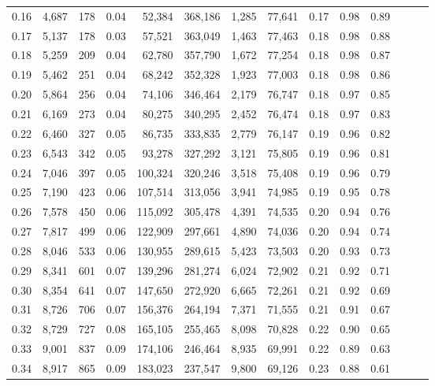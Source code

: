 \begin{tabular}{rrrrrrrrrrrrrr}
0.16 &  4,687 &    178 &  0.04 &   52,384 &  368,186 &   1,285 &  77,641 &  0.17 &  0.98 &      0.89 \\
0.17 &  5,137 &    178 &  0.03 &   57,521 &  363,049 &   1,463 &  77,463 &  0.18 &  0.98 &      0.88 \\
0.18 &  5,259 &    209 &  0.04 &   62,780 &  357,790 &   1,672 &  77,254 &  0.18 &  0.98 &      0.87 \\
0.19 &  5,462 &    251 &  0.04 &   68,242 &  352,328 &   1,923 &  77,003 &  0.18 &  0.98 &      0.86 \\
0.20 &  5,864 &    256 &  0.04 &   74,106 &  346,464 &   2,179 &  76,747 &  0.18 &  0.97 &      0.85 \\
0.21 &  6,169 &    273 &  0.04 &   80,275 &  340,295 &   2,452 &  76,474 &  0.18 &  0.97 &      0.83 \\
0.22 &  6,460 &    327 &  0.05 &   86,735 &  333,835 &   2,779 &  76,147 &  0.19 &  0.96 &      0.82 \\
0.23 &  6,543 &    342 &  0.05 &   93,278 &  327,292 &   3,121 &  75,805 &  0.19 &  0.96 &      0.81 \\
0.24 &  7,046 &    397 &  0.05 &  100,324 &  320,246 &   3,518 &  75,408 &  0.19 &  0.96 &      0.79 \\
0.25 &  7,190 &    423 &  0.06 &  107,514 &  313,056 &   3,941 &  74,985 &  0.19 &  0.95 &      0.78 \\
0.26 &  7,578 &    450 &  0.06 &  115,092 &  305,478 &   4,391 &  74,535 &  0.20 &  0.94 &      0.76 \\
0.27 &  7,817 &    499 &  0.06 &  122,909 &  297,661 &   4,890 &  74,036 &  0.20 &  0.94 &      0.74 \\
0.28 &  8,046 &    533 &  0.06 &  130,955 &  289,615 &   5,423 &  73,503 &  0.20 &  0.93 &      0.73 \\
0.29 &  8,341 &    601 &  0.07 &  139,296 &  281,274 &   6,024 &  72,902 &  0.21 &  0.92 &      0.71 \\
0.30 &  8,354 &    641 &  0.07 &  147,650 &  272,920 &   6,665 &  72,261 &  0.21 &  0.92 &      0.69 \\
0.31 &  8,726 &    706 &  0.07 &  156,376 &  264,194 &   7,371 &  71,555 &  0.21 &  0.91 &      0.67 \\
0.32 &  8,729 &    727 &  0.08 &  165,105 &  255,465 &   8,098 &  70,828 &  0.22 &  0.90 &      0.65 \\
0.33 &  9,001 &    837 &  0.09 &  174,106 &  246,464 &   8,935 &  69,991 &  0.22 &  0.89 &      0.63 \\
0.34 &  8,917 &    865 &  0.09 &  183,023 &  237,547 &   9,800 &  69,126 &  0.23 &  0.88 &      0.61 \\

\end{tabular}
